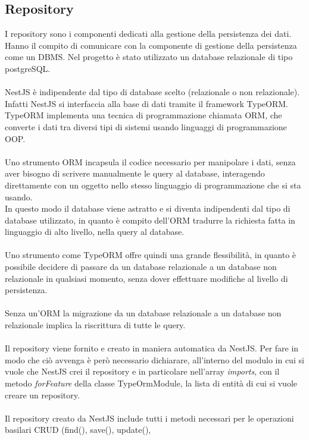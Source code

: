 \subsection{Repository}
I repository sono i componenti dedicati alla gestione della persistenza dei dati. Hanno il compito di
comunicare con la componente di gestione della persistenza come un \gls{DBMS}\glsfirstoccur. Nel progetto è stato utilizzato un database
relazionale di tipo postgreSQL.
\\\\
NestJS è indipendente dal tipo di database scelto (relazionale o non relazionale). Infatti NestJS si interfaccia
alla base di dati tramite il framework TypeORM. TypeORM implementa una tecnica di programmazione chiamata 
\gls{ORM}\glsfirstoccur, che converte i dati tra diversi tipi di sistemi usando linguaggi di programmazione \gls{OOP}\glsfirstoccur.
\\\\
Uno strumento \gls{ORM} incapsula il codice necessario per manipolare i dati, senza aver bisogno di scrivere manualmente
le query al database, interagendo direttamente con un oggetto nello stesso linguaggio di programmazione che si sta usando. 
\\
In questo modo il database viene astratto e si diventa indipendenti dal tipo di database utilizzato, in quanto è compito dell'\gls{ORM}
tradurre la richiesta fatta in linguaggio di alto livello, nella query al database. 
\\\\
Uno strumento come TypeORM offre quindi una grande flessibilità, in quanto è possibile decidere di passare da un database
relazionale a un database non relazionale in qualsiasi momento, senza dover effettuare modifiche al livello di persistenza.
\\\\
Senza un'\gls{ORM} la migrazione da un database relazionale a un database non relazionale implica la riscrittura di tutte le query.
\\\\
Il repository viene fornito e creato in maniera automatica da NestJS. Per fare in modo che ciò avvenga è però necessario
dichiarare, all'interno del modulo in cui si vuole che NestJS crei il repository e in particolare nell'array \textit{imports}, con 
il metodo \textit{forFeature} della classe TypeOrmModule, la lista di entità di cui si vuole creare un repository.
\\\\
Il repository creato da NestJS include tutti i metodi necessari per le operazioni basilari \gls{CRUD} (find(), save(), update(), 
